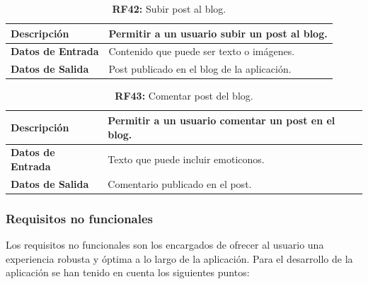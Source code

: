 \documentclass[a4paper, 12pt]{article}
\begin{document}
\begin{table}[H]
\captionsetup{justification=raggedright,singlelinecheck=false}
\caption{\textbf{RF42:} Subir post al blog.}
\label{tab:RF42}
	\begin{tabular}{|m{5cm}|m{10cm}|}
	\hline
	\textbf{Descripción} & Permitir a un usuario subir un post al blog. \\ 
	\hline
	\textbf{Datos de Entrada} & Contenido que puede ser texto o imágenes. \\ 
	\hline
	\textbf{Datos de Salida} & Post publicado en el blog de la aplicación. \\ 
	\hline
\end{tabular}
\end{table}

\begin{table}[H]
\captionsetup{justification=raggedright,singlelinecheck=false}
\caption{\textbf{RF43:} Comentar post del blog.}
\label{tab:RF43}
	\begin{tabular}{|m{5cm}|m{10cm}|}
	\hline
	\textbf{Descripción} & Permitir a un usuario comentar un post en el blog. \\ 
	\hline
	\textbf{Datos de Entrada} & Texto que puede incluir emoticonos. \\ 
	\hline
	\textbf{Datos de Salida} & Comentario publicado en el post. \\ 
	\hline
\end{tabular}
\end{table}


\subsubsection{Requisitos no funcionales}

Los requisitos no funcionales son los encargados de ofrecer al usuario una experiencia robusta y óptima a lo largo de la aplicación. Para el desarrollo de la aplicación se han tenido en cuenta los siguientes puntos:
\end{document}
